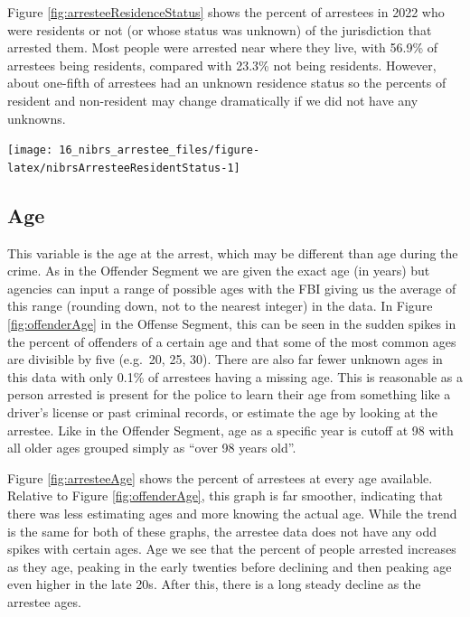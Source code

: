 \documentclass[
]{krantz}
\let\origfigure\figure
\let\endorigfigure\endfigure
\renewenvironment{figure}[1][2] {
    \expandafter\origfigure\expandafter[H]
} {
    \endorigfigure
}
\begin{document}
Figure \ref{fig:arresteeResidenceStatus} shows the percent
of arrestees in 2022 who were residents or not (or whose
status was unknown) of the jurisdiction that arrested them.
Most people were arrested near where they live, with 56.9\%
of arrestees being residents, compared with 23.3\% not being
residents. However, about one-fifth of arrestees had an
unknown residence status so the percents of resident and
non-resident may change dramatically if we did not have any
unknowns.

\begin{figure}

{\centering \texttt{[image: 16\_nibrs\_arrestee\_files/figure-latex/nibrsArresteeResidentStatus-1]} 

}

\caption{Annual resident status (i.e. if they live in the arresting jurisdiction) of arrestees, 1991-2023.}\label{fig:nibrsArresteeResidentStatus}
\end{figure}

\subsection{Age}\label{age-4}

This variable is the age at the arrest, which may be
different than age during the crime. As in the Offender
Segment we are given the exact age (in years) but agencies
can input a range of possible ages with the FBI giving us
the average of this range (rounding down, not to the nearest
integer) in the data. In Figure \ref{fig:offenderAge} in the
Offense Segment, this can be seen in the sudden spikes in
the percent of offenders of a certain age and that some of
the most common ages are divisible by five (e.g.~20, 25,
30). There are also far fewer unknown ages in this data with
only 0.1\% of arrestees having a missing age. This is
reasonable as a person arrested is present for the police to
learn their age from something like a driver's license or
past criminal records, or estimate the age by looking at the
arrestee. Like in the Offender Segment, age as a specific
year is cutoff at 98 with all older ages grouped simply as
``over 98 years old''.

Figure \ref{fig:arresteeAge} shows the percent of arrestees
at every age available. Relative to Figure
\ref{fig:offenderAge}, this graph is far smoother,
indicating that there was less estimating ages and more
knowing the actual age. While the trend is the same for both
of these graphs, the arrestee data does not have any odd
spikes with certain ages. Age we see that the percent of
people arrested increases as they age, peaking in the early
twenties before declining and then peaking age even higher
in the late 20s. After this, there is a long steady decline
as the arrestee ages.
\end{document}
